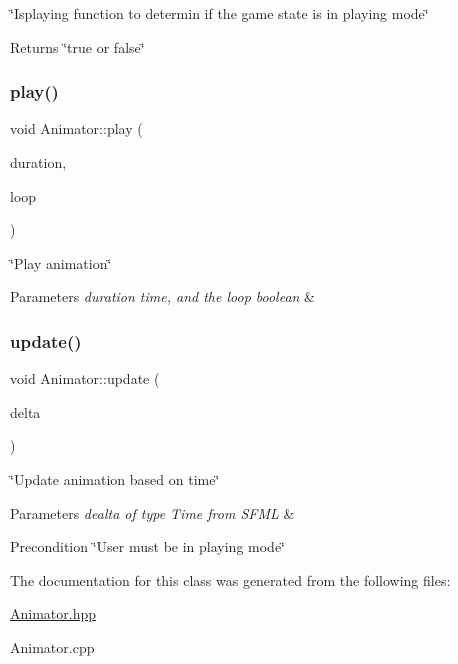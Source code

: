 \char`\"{}\+Isplaying function to determin if the game state is in playing mode\char`\"{} 

\begin{DoxyReturn}{Returns}
\char`\"{}true or false\char`\"{} 
\end{DoxyReturn}
\mbox{\label{classAnimator_a36e5cb2d273648b60b32f9dfdec08b63}} 
\subsubsection{\texorpdfstring{play()}{play()}}
{\footnotesize\ttfamily void Animator\+::play (\begin{DoxyParamCaption}\item[{sf\+::\+Time}]{duration,  }\item[{bool}]{loop }\end{DoxyParamCaption})}



\char`\"{}\+Play animation\char`\"{} 


\begin{DoxyParams}{Parameters}
{\em duration time, and the loop boolean} & \\
\hline
\end{DoxyParams}
\mbox{\label{classAnimator_a619d6e7f88fcf2788a58ccf19068c73b}} 
\subsubsection{\texorpdfstring{update()}{update()}}
{\footnotesize\ttfamily void Animator\+::update (\begin{DoxyParamCaption}\item[{sf\+::\+Time}]{delta }\end{DoxyParamCaption})}



\char`\"{}\+Update animation based on time\char`\"{} 


\begin{DoxyParams}{Parameters}
{\em dealta of type Time from S\+F\+ML} & \\
\hline
\end{DoxyParams}
\begin{DoxyPrecond}{Precondition}
\char`\"{}\+User must be in playing mode\char`\"{} 
\end{DoxyPrecond}


The documentation for this class was generated from the following files\+:\begin{DoxyCompactItemize}
\item 
\hyperlink{Animator_8hpp}{Animator.\+hpp}\item 
Animator.\+cpp\end{DoxyCompactItemize}
